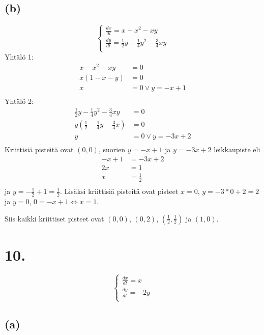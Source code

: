 \documentclass{article}
\begin{document}
\subsection*{(b)}

\[
  \begin{cases}
    \frac{dx}{dt} = x - x^2 - xy \\
    \frac{dy}{dt} = \frac{1}{2}y - \frac{1}{4}y^2 - \frac{3}{4}xy \\
  \end{cases}
\]
Yhtälö 1:
\begin{align*}
  x - x^2 - xy &= 0 \\
  x(1 - x - y) &= 0 \\
  x &= 0 \vee y = -x + 1 \\
\end{align*}
Yhtälö 2:
\begin{align*}
  \frac{1}{2}y - \frac{1}{4}y^2 - \frac{3}{4}xy &= 0 \\
  y(\frac{1}{2} - \frac{1}{4}y - \frac{3}{4}x) &= 0 \\
  y &= 0 \vee y = -3x + 2 \\
\end{align*}
Kriittisiä pisteitä ovat $(0, 0)$, suorien
$y = -x + 1$ ja $y = -3x + 2$ leikkaupiste eli
\begin{align*}
  -x + 1 &= -3x + 2 \\
  2x &= 1 \\
  x &= \frac{1}{2} \\
\end{align*}
ja
$y = -\frac{1}{2} + 1 = \frac{1}{2}$.
Lisäksi kriittisiä pisteitä ovat pisteet $x = 0$, $y = -3*0 + 2 = 2$
ja $y = 0$, $0 = -x + 1 \iff x = 1$.

Siis kaikki kriittiset pisteet ovat $(0, 0)$, $(0, 2)$, $(\frac{1}{2}, \frac{1}{2})$
ja $(1, 0)$.

\section*{10.}

\[
  \begin{cases}
    \frac{dx}{dt} = x \\
    \frac{dy}{dt} = -2y \\
  \end{cases}
\]

\subsection*{(a)}
\end{document}
